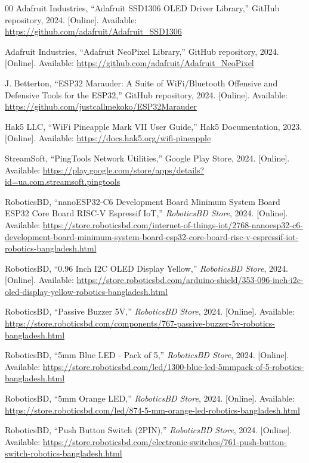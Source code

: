 \documentclass[conference]{IEEEtran}
\begin{document}
\begin{thebibliography}{00}
Adafruit Industries, ``Adafruit SSD1306 OLED Driver Library,'' GitHub repository, 2024. [Online]. Available: \url{https://github.com/adafruit/Adafruit_SSD1306}

Adafruit Industries, ``Adafruit NeoPixel Library,'' GitHub repository, 2024. [Online]. Available: \url{https://github.com/adafruit/Adafruit_NeoPixel}

J. Betterton, ``ESP32 Marauder: A Suite of WiFi/Bluetooth Offensive and Defensive Tools for the ESP32,'' GitHub repository, 2024. [Online]. Available: \url{https://github.com/justcallmekoko/ESP32Marauder}

Hak5 LLC, ``WiFi Pineapple Mark VII User Guide,'' Hak5 Documentation, 2023. [Online]. Available: \url{https://docs.hak5.org/wifi-pineapple}

StreamSoft, ``PingTools Network Utilities,'' Google Play Store, 2024. [Online]. Available: \url{https://play.google.com/store/apps/details?id=ua.com.streamsoft.pingtools}

RoboticsBD, ``nanoESP32-C6 Development Board Minimum System Board ESP32 Core Board RISC-V Espressif IoT,'' \textit{RoboticsBD Store}, 2024. [Online]. Available: \url{https://store.roboticsbd.com/internet-of-things-iot/2768-nanoesp32-c6-development-board-minimum-system-board-esp32-core-board-risc-v-espressif-iot-robotics-bangladesh.html}

RoboticsBD, ``0.96 Inch I2C OLED Display Yellow,'' \textit{RoboticsBD Store}, 2024. [Online]. Available: \url{https://store.roboticsbd.com/arduino-shield/353-096-inch-i2c-oled-display-yellow-robotics-bangladesh.html}

RoboticsBD, ``Passive Buzzer 5V,'' \textit{RoboticsBD Store}, 2024. [Online]. Available: \url{https://store.roboticsbd.com/components/767-passive-buzzer-5v-robotics-bangladesh.html}

RoboticsBD, ``5mm Blue LED - Pack of 5,'' \textit{RoboticsBD Store}, 2024. [Online]. Available: \url{https://store.roboticsbd.com/led/1300-blue-led-5mmpack-of-5-robotics-bangladesh.html}

RoboticsBD, ``5mm Orange LED,'' \textit{RoboticsBD Store}, 2024. [Online]. Available: \url{https://store.roboticsbd.com/led/874-5-mm-orange-led-robotics-bangladesh.html}

RoboticsBD, ``Push Button Switch (2PIN),'' \textit{RoboticsBD Store}, 2024. [Online]. Available: \url{https://store.roboticsbd.com/electronic-switches/761-push-button-switch-robotics-bangladesh.html}


\end{thebibliography}
\end{document}
